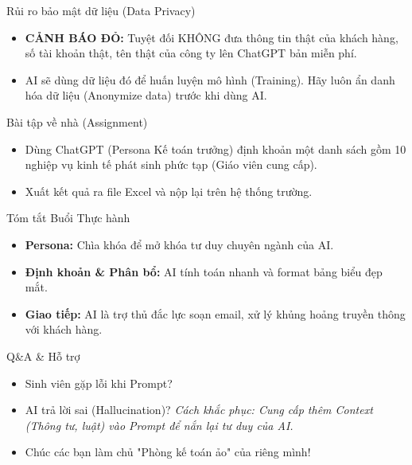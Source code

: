 \documentclass[aspectratio=169]{beamer}
\begin{document}
\begin{frame}{Rủi ro bảo mật dữ liệu (Data Privacy)}
    \begin{itemize}
        \item \textbf{CẢNH BÁO ĐỎ:} Tuyệt đối KHÔNG đưa thông tin thật của khách hàng, số tài khoản thật, tên thật của công ty lên ChatGPT bản miễn phí.
        \item AI sẽ dùng dữ liệu đó để huấn luyện mô hình (Training). Hãy luôn ẩn danh hóa dữ liệu (Anonymize data) trước khi dùng AI.
    \end{itemize}
\end{frame}


\begin{frame}{Bài tập về nhà (Assignment)}
    \begin{itemize}
        \item Dùng ChatGPT (Persona Kế toán trưởng) định khoản một danh sách gồm 10 nghiệp vụ kinh tế phát sinh phức tạp (Giáo viên cung cấp).
        \item Xuất kết quả ra file Excel và nộp lại trên hệ thống trường.
    \end{itemize}
\end{frame}


\begin{frame}{Tóm tắt Buổi Thực hành}
    \begin{itemize}
        \item \textbf{Persona:} Chìa khóa để mở khóa tư duy chuyên ngành của AI.
        \item \textbf{Định khoản \& Phân bổ:} AI tính toán nhanh và format bảng biểu đẹp mắt.
        \item \textbf{Giao tiếp:} AI là trợ thủ đắc lực soạn email, xử lý khủng hoảng truyền thông với khách hàng.
    \end{itemize}
\end{frame}


\begin{frame}{Q\&A \& Hỗ trợ}
    \begin{itemize}
        \item Sinh viên gặp lỗi khi Prompt?
        \item AI trả lời sai (Hallucination)? \textit{Cách khắc phục: Cung cấp thêm Context (Thông tư, luật) vào Prompt để nắn lại tư duy của AI.}
        \item Chúc các bạn làm chủ "Phòng kế toán ảo" của riêng mình!
    \end{itemize}
\end{frame}
\end{document}
